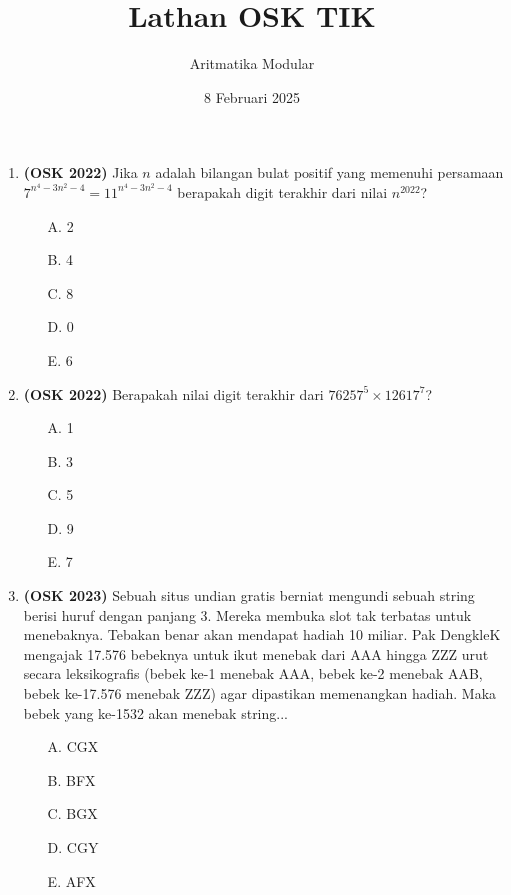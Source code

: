\documentclass[a4paper]{article}
\title{Lathan OSK TIK}
\author{Aritmatika Modular}
\date{8 Februari 2025}
\begin{document}
  \maketitle
  \begin{enumerate}
    \item\textbf{(OSK 2022)} Jika \( n \) adalah bilangan bulat positif yang memenuhi persamaan
    $
    7^{n^4 - 3n^2 - 4} = 11^{n^4 - 3n^2 - 4}
    $
    berapakah digit terakhir dari nilai \( n^{2022} \)?
    
    \begin{enumerate}
        \item[A.] 2
        \item[B.] 4
        \item[C.] 8
        \item[D.] 0
        \item[E.] 6
    \end{enumerate}

    \item\textbf{(OSK 2022)} Berapakah nilai digit terakhir dari $76257^5 \times 12617^7$?
    \begin{itemize}
        \item[A.] 1
        \item[B.] 3
        \item[C.] 5
        \item[D.] 9
        \item[E.] 7
    \end{itemize}

    \item\textbf{(OSK 2023)} Sebuah situs undian gratis berniat mengundi sebuah string berisi huruf dengan panjang 3. 
    Mereka membuka slot tak terbatas untuk menebaknya. Tebakan benar akan mendapat hadiah 10 miliar. 
    Pak DengkleK mengajak 17.576 bebeknya untuk ikut menebak dari AAA hingga ZZZ urut secara leksikografis 
    (bebek ke-1 menebak AAA, bebek ke-2 menebak AAB, bebek ke-17.576 menebak ZZZ) agar dipastikan memenangkan hadiah. 
    Maka bebek yang ke-1532 akan menebak string...
    \begin{itemize}
        \item[A.] CGX
        \item[B.] BFX
        \item[C.] BGX
        \item[D.] CGY
        \item[E.] AFX
    \end{itemize}
    

\end{enumerate}
\end{document}

